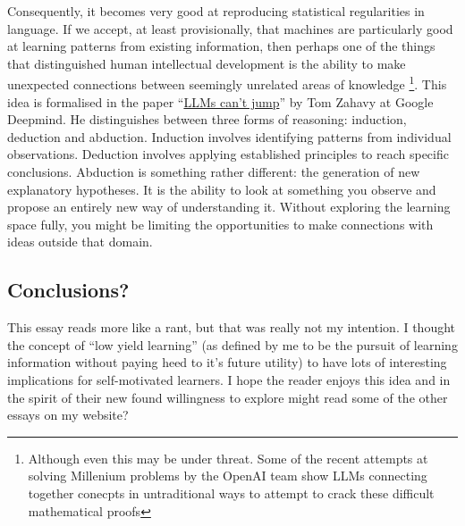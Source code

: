 \documentclass{article}
\begin{document}
Consequently, it becomes very good at reproducing statistical regularities in language. If we accept, at least provisionally, that machines are particularly good at learning patterns from existing information, then perhaps one of the things that distinguished human intellectual development is the ability to make unexpected connections between seemingly unrelated areas of knowledge \footnote{Although even this may be under threat. Some of the recent attempts at solving Millenium problems by the OpenAI team show LLMs connecting together conecpts in untraditional ways to attempt to crack these difficult mathematical proofs}. This idea is formalised in the paper ``\href{https://www.tomzahavy.com/projects/llms-cant-jump}{LLMs can't jump}'' by Tom Zahavy at Google Deepmind. He distinguishes between three forms of reasoning: induction, deduction and abduction. Induction involves identifying patterns from individual observations. Deduction involves applying established principles to reach specific conclusions. Abduction is something rather different: the generation of new explanatory hypotheses. It is the ability to look at something you observe and propose an entirely new way of understanding it. Without exploring the learning space fully, you might be limiting the opportunities to make connections with ideas outside that domain. 

\subsection*{Conclusions?}

This essay reads more like a rant, but that was really not my intention. I thought the concept of ``low yield learning'' (as defined by me to be the pursuit of learning information without paying heed to it's future utility) to have lots of interesting implications for self-motivated learners. I hope the reader enjoys this idea and in the spirit of their new found willingness to explore might read some of the other essays on my website? 
	
\end{document}
